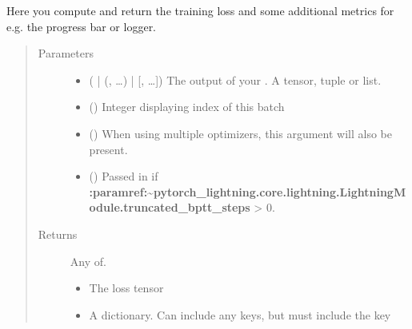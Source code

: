 \documentclass[letterpaper,10pt,english]{sphinxmanual}
\begin{document}
\begin{fulllineitems}
\begin{fulllineitems}
\label{\detokenize{pages/ml:vipercore.ml.plmodels.AutoEncoderModel.training_step}}
\sphinxAtStartPar
Here you compute and return the training loss and some additional metrics for e.g.
the progress bar or logger.
\begin{quote}\begin{description}
\item[{Parameters}] \leavevmode\begin{itemize}
\item {} 
\sphinxAtStartPar
{} ( | (, …) | {[}, …{]}) \textendash{} The output of your . A tensor, tuple or list.

\item {} 
\sphinxAtStartPar
{} () \textendash{} Integer displaying index of this batch

\item {} 
\sphinxAtStartPar
{} () \textendash{} When using multiple optimizers, this argument will also be present.

\item {} 
\sphinxAtStartPar
{} () \textendash{} Passed in if
{\color{red}\bfseries{}:paramref:\textasciigrave{}\textasciitilde{}pytorch\_lightning.core.lightning.LightningModule.truncated\_bptt\_steps\textasciigrave{}} \textgreater{} 0.

\end{itemize}

\item[{Returns}] \leavevmode
\sphinxAtStartPar

\sphinxAtStartPar
Any of.
\begin{itemize}
\item {} 
\sphinxAtStartPar
{} \sphinxhyphen{} The loss tensor

\item {} 
\sphinxAtStartPar
{} \sphinxhyphen{} A dictionary. Can include any keys, but must include the key 


\end{itemize}
\end{description}
\end{quote}
\end{fulllineitems}
\end{fulllineitems}
\end{document}
